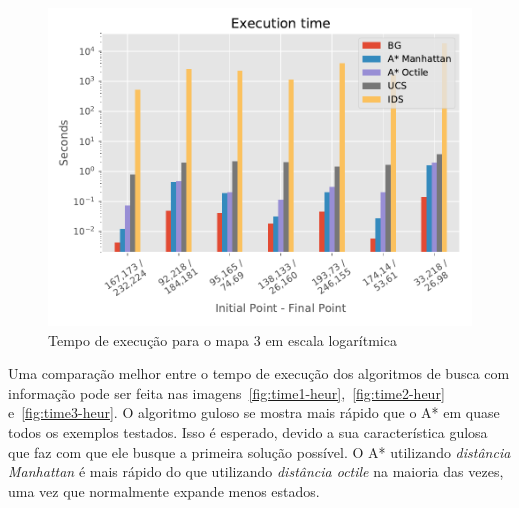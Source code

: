 \begin{figure}[!htbp]
\begin{minipage}{0.5\linewidth}
\includegraphics[width=\textwidth]{Images/Execution_time_map3_log.pdf}
\caption{Tempo de execução para o mapa 3 em escala logarítmica}
\label{fig:time3}
\end{minipage}
\end{figure}

Uma comparação melhor entre o tempo de execução dos algoritmos de busca com informação pode ser feita nas imagens~\ref{fig:time1-heur},~\ref{fig:time2-heur} e~\ref{fig:time3-heur}. O algoritmo guloso se mostra mais rápido que o A* em quase todos os exemplos testados. Isso é esperado, devido a sua característica gulosa que faz com que ele busque a primeira solução possível. O A* utilizando \textit{distância Manhattan} é mais rápido do que utilizando \textit{distância octile} na maioria das vezes, uma vez que normalmente expande menos estados.


